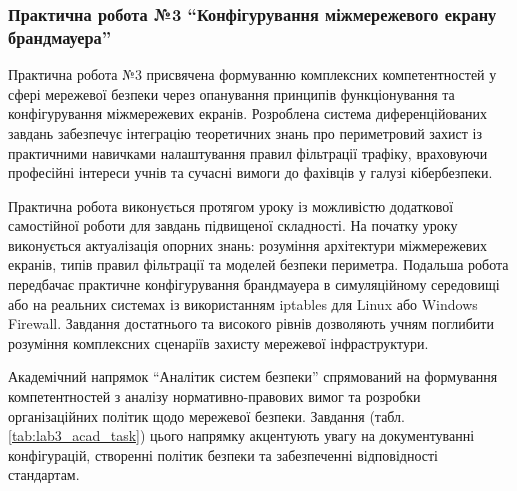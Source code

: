 \subsubsection{Практична робота №3 ``Конфігурування міжмережевого екрану брандмауера''}

Практична робота №3 присвячена формуванню комплексних компетентностей у сфері мережевої безпеки через опанування принципів функціонування та конфігурування міжмережевих екранів. Розроблена система диференційованих завдань забезпечує інтеграцію теоретичних знань про периметровий захист із практичними навичками налаштування правил фільтрації трафіку, враховуючи професійні інтереси учнів та сучасні вимоги до фахівців у галузі кібербезпеки.

Практична робота виконується протягом уроку із можливістю додаткової самостійної роботи для завдань підвищеної складності. На початку уроку виконується актуалізація опорних знань: розуміння архітектури міжмережевих екранів, типів правил фільтрації та моделей безпеки периметра. Подальша робота передбачає практичне конфігурування брандмауера в симуляційному середовищі або на реальних системах із використанням iptables для Linux або Windows Firewall. Завдання достатнього та високого рівнів дозволяють учням поглибити розуміння комплексних сценаріїв захисту мережевої інфраструктури.

Академічний напрямок ``Аналітик систем безпеки'' спрямований на формування компетентностей з аналізу нормативно-правових вимог та розробки організаційних політик щодо мережевої безпеки. Завдання (табл. \ref{tab:lab3_acad_task}) цього напрямку акцентують увагу на документуванні конфігурацій, створенні політик безпеки та забезпеченні відповідності стандартам.



